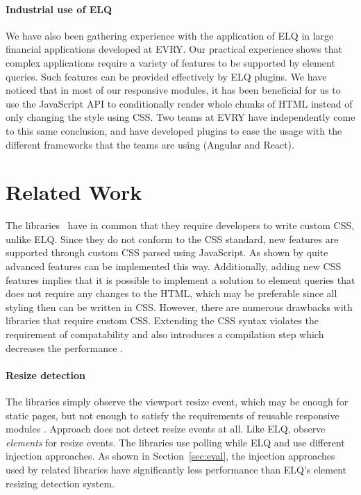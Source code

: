 \documentclass[sigplan,9pt]{acmart}
\newcommand{\elq}{ELQ}
\begin{document}
    \paragraph{Industrial use of \elq{}}
    We have also been gathering experience with the application of
    \elq{} in large financial applications developed at EVRY.
    Our practical experience shows that complex applications
    require a variety of features to be supported by element queries.
    Such features can be provided effectively by \elq{} plugins.
    We have noticed that in most of our responsive modules, it has been beneficial for us to use the JavaScript API
    to conditionally render whole chunks of HTML instead of only changing the style using CSS.
    Two teams at EVRY have independently come to this same conclusion, and have developed plugins to ease the usage with the different frameworks that the teams are using (Angular and React).

\section{Related Work}\label{sec:related}
  The libraries~\cite{eq_imp_magichtml,eq_imp_eqcss,eq_imp_prollyfill-min-width,eq_imp_localised-css,eq_imp_gss} have in common that they require developers to write custom CSS, unlike \elq{}.
  Since they do not conform to the CSS standard, new features are supported through custom CSS parsed using JavaScript.
  As shown by \cite{eq_imp_eqcss,eq_imp_gss} quite advanced features can be implemented this way.
  Additionally, adding new CSS features implies that it is possible to implement a solution to element queries that does not require any changes to the HTML, which may be preferable since all styling then can be written in CSS.
  However, there are numerous drawbacks with libraries that require custom CSS.
  Extending the CSS syntax violates the requirement of compatability and also introduces a compilation step which decreases the performance \cite{elq-thesis}.

  \paragraph{Resize detection}
  The libraries \cite{eq_imp_eqcss,eq_imp_breakpointsjs,eq_imp_mediaclass,eq_imp_elementquery,eq_imp_responsive-elements,eq_imp_sickles,eq_imp_responsive-elements-2,eq_imp_breaks2000,eq_imp_eqjs} simply observe the viewport resize event, which may be enough for static pages, but not enough to satisfy the requirements of reusable responsive modules \cite{elq-thesis}.
  Approach \cite{eq_imp_classquery} does not detect resize events at all.
  Like \elq{}, \cite{eq_imp_localised-css,eq_imp_selector_queries,eq_imp_prollyfill-min-width,eq_imp_gss,eq_imp_element-queries,eq_imp_css-element-queries} observe \emph{elements} for resize events.
  The libraries \cite{eq_imp_localised-css,eq_imp_selector_queries} use polling while \elq{} and \cite{eq_imp_prollyfill-min-width,eq_imp_gss,eq_imp_element-queries,eq_imp_css-element-queries} use different injection approaches.
  As shown in Section~\ref{sec:eval}, the injection approaches used by related libraries have significantly less performance than \elq{}'s element resizing detection system.
\end{document}
